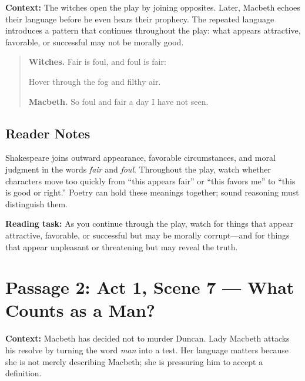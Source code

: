 \documentclass[12pt]{article}
\newenvironment{playpassage}{\begin{quote}\small\setlength{\parskip}{0.25em}}{\end{quote}}
\newcommand{\speaker}[1]{\textbf{#1.}}
\begin{document}
\textbf{Context:} The witches open the play by joining opposites. Later, Macbeth echoes their language before he even hears their prophecy. The repeated language introduces a pattern that continues throughout the play: what appears attractive, favorable, or successful may not be morally good.

\begin{playpassage}
\speaker{Witches} Fair is foul, and foul is fair:\par
Hover through the fog and filthy air.

\speaker{Macbeth} So foul and fair a day I have not seen.
\end{playpassage}

\subsection*{Reader Notes}

Shakespeare joins outward appearance, favorable circumstances, and moral judgment in the words \textit{fair} and \textit{foul}. Throughout the play, watch whether characters move too quickly from ``this appears fair'' or ``this favors me'' to ``this is good or right.'' Poetry can hold these meanings together; sound reasoning must distinguish them.

\textbf{Reading task:} As you continue through the play, watch for things that appear attractive, favorable, or successful but may be morally corrupt---and for things that appear unpleasant or threatening but may reveal the truth.

\newpage

\section*{Passage 2: Act 1, Scene 7 --- What Counts as a Man?}

\textbf{Context:} Macbeth has decided not to murder Duncan. Lady Macbeth attacks his resolve by turning the word \textit{man} into a test. Her language matters because she is not merely describing Macbeth; she is pressuring him to accept a definition.
\end{document}
